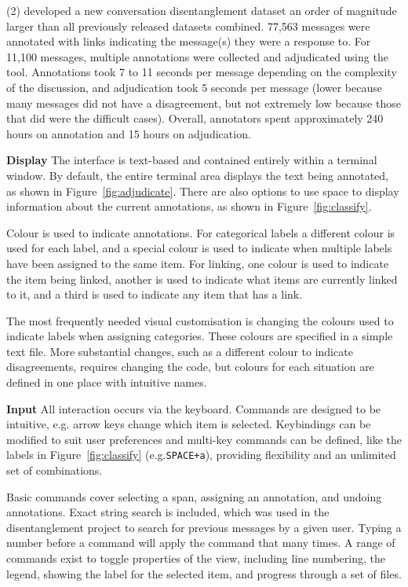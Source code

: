 \documentclass[11pt,a4paper]{article}
\makeatletter
\newcommand{\myeg}{e.g.\@\xspace}
\newcommand{\tightparagraph}[1]{\noindent\textbf{#1}}
\makeatother
\begin{document}
(2) \citet{acl19disentangle} developed a new conversation disentanglement dataset an order of magnitude larger than all previously released datasets combined.
77,563 messages were annotated with links indicating the message(s) they were a response to.
For 11,100 messages, multiple annotations were collected and adjudicated using the tool.
Annotations took 7 to 11 seconds per message depending on the complexity of the discussion, and adjudication took 5 seconds per message (lower because many messages did not have a disagreement, but not extremely low because those that did were the difficult cases).
Overall, annotators spent approximately 240 hours on annotation and 15 hours on adjudication.



\tightparagraph{Display}
The interface is text-based and contained entirely within a terminal window.
By default, the entire terminal area displays the text being annotated, as shown in Figure~\ref{fig:adjudicate}.
There are also options to use space to display information about the current annotations, as shown in Figure~\ref{fig:classify}.

Colour is used to indicate annotations.
For categorical labels a different colour is used for each label, and a special colour is used to indicate when multiple labels have been assigned to the same item.
For linking, one colour is used to indicate the item being linked, another is used to indicate what items are currently linked to it, and a third is used to indicate any item that has a link.

The most frequently needed visual customisation is changing the colours used to indicate labels when assigning categories.
These colours are specified in a simple text file.
More substantial changes, such as a different colour to indicate disagreements, requires changing the code, but colours for each situation are defined in one place with intuitive names.

\tightparagraph{Input}
All interaction occurs via the keyboard.
Commands are designed to be intuitive, \myeg arrow keys change which item is selected.
Keybindings can be modified to suit user preferences and multi-key commands can be defined, like the labels in Figure~\ref{fig:classify} (\myeg \texttt{SPACE+a}), providing flexibility and an unlimited set of combinations.

Basic commands cover selecting a span, assigning an annotation, and undoing annotations.
Exact string search is included, which was used in the disentanglement project to search for previous messages by a given user.
Typing a number before a command will apply the command that many times.
A range of commands exist to toggle properties of the view, including line numbering, the legend, showing the label for the selected item, and progress through a set of files.
\end{document}
